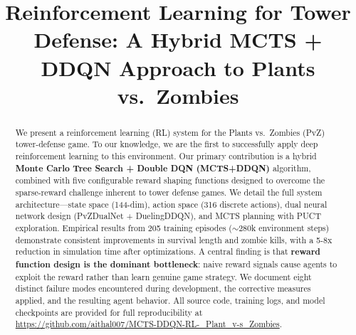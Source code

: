 \documentclass[conference]{IEEEtran}
\begin{document}
\title{Reinforcement Learning for Tower Defense: A Hybrid MCTS + DDQN Approach to Plants vs.\ Zombies}

\author{
\and
{}
}

\maketitle

\begin{abstract}
We present a reinforcement learning (RL) system for the Plants vs.\ Zombies (PvZ) tower-defense game. To our knowledge, we are the first to successfully apply deep reinforcement learning to this environment. Our primary contribution is a hybrid \textbf{Monte Carlo Tree Search + Double DQN (MCTS+DDQN)} algorithm, combined with five configurable reward shaping functions designed to overcome the sparse-reward challenge inherent to tower defense games. We detail the full system architecture---state space (144-dim), action space (316 discrete actions), dual neural network design (PvZDualNet + DuelingDDQN), and MCTS planning with PUCT exploration. Empirical results from 205 training episodes ($\sim$280k environment steps) demonstrate consistent improvements in survival length and zombie kills, with a 5-8x reduction in simulation time after optimizations. A central finding is that \textbf{reward function design is the dominant bottleneck}: naive reward signals cause agents to exploit the reward rather than learn genuine game strategy. We document eight distinct failure modes encountered during development, the corrective measures applied, and the resulting agent behavior. All source code, training logs, and model checkpoints are provided for full reproducibility at \url{https://github.com/aithal007/MCTS-DDQN-RL-_Plant_v-s_Zombies}.
\end{abstract}
\end{document}
